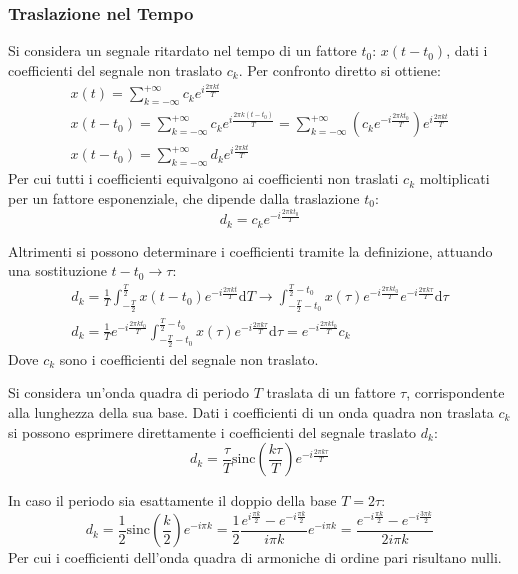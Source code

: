 \documentclass{article}
\newcommand{\sinc}{\mathrm{sinc}}
\newcommand{\df}{\mathrm{d}}
\numberwithin{equation}{subsection}
\begin{document}
\subsubsection{Traslazione nel Tempo}

Si considera un segnale ritardato nel tempo di un fattore $t_0$: $x(t-t_0)$, dati i coefficienti del segnale non traslato $c_k$. Per confronto diretto si ottiene:
\begin{gather*}
    x(t)=\displaystyle\sum_{k=-\infty}^{+\infty}c_ke^{i\frac{2\pi kt}{T}}\\
    x(t-t_0)=\displaystyle\sum_{k=-\infty}^{+\infty}c_ke^{i\frac{2\pi k(t-t_0)}{T}}=\sum_{k=-\infty}^{+\infty}\left(c_ke^{-i\frac{2\pi kt_0}{T}}\right)e^{i\frac{2\pi kt}{T}}\\
    x(t-t_0)=\displaystyle\sum_{k=-\infty}^{+\infty}d_ke^{i\frac{2\pi kt}{T}}
\end{gather*}
Per cui tutti i coefficienti equivalgono ai coefficienti non traslati $c_k$ moltiplicati per un fattore esponenziale, che dipende dalla traslazione $t_0$:
\begin{equation*}
    \displaystyle d_k=c_ke^{-i\frac{2\pi kt_0}{T}}
\end{equation*}

Altrimenti si possono determinare i coefficienti tramite la definizione, attuando una sostituzione $t-t_0\to\tau$:
\begin{gather*}
    d_k=\displaystyle\frac{1}{T}\int_{-\frac{T}{2}}^{\frac{T}{2}}x(t-t_0)e^{-i\frac{2\pi kt}{T}}\df T\to\int_{-\frac{T}{2}-t_0}^{\frac{T}{2}-t_0}x(\tau)e^{-i\frac{2\pi kt_0}{T}}e^{-i\frac{2\pi k\tau}{T}}\df\tau\\
    d_k=\displaystyle\frac{1}{T}e^{-i\frac{2\pi kt_0}{T}}\int_{-\frac{T}{2}-t_0}^{\frac{T}{2}-t_0}x(\tau)e^{-i\frac{2\pi k\tau}{T}}\df\tau=e^{-i\frac{2\pi kt_0}{T}}c_k
\end{gather*}
Dove $c_k$ sono i coefficienti del segnale non traslato. 


Si considera un'onda quadra di periodo $T$ traslata di un fattore $\tau$, corrispondente alla lunghezza della sua base. Dati i coefficienti di un onda quadra non traslata 
$c_k$ si possono esprimere direttamente i coefficienti del segnale traslato $d_k$:
\begin{equation*}
    d_k=\displaystyle\frac{\tau}{T}\sinc\left(\frac{k\tau}{T}\right)e^{-i\frac{2\pi k\tau}{T}}
\end{equation*}

In caso il periodo sia esattamente il doppio della base $T=2\tau$:
\begin{equation*}
    d_k=\displaystyle\frac{1}{2}\sinc\left(\frac{k}{2}\right)e^{-i\pi k}=\frac{1}{2}\frac{e^{i\frac{\pi k}{2}}-e^{-i\frac{\pi k}{2}}}{i\pi k}e^{-i\pi k}=
    \frac{e^{-i\frac{\pi k}{2}}-e^{-i\frac{3\pi k}{2}}}{2i\pi k}
\end{equation*}
Per cui i coefficienti dell'onda quadra di armoniche di ordine pari risultano nulli. 
\end{document}
